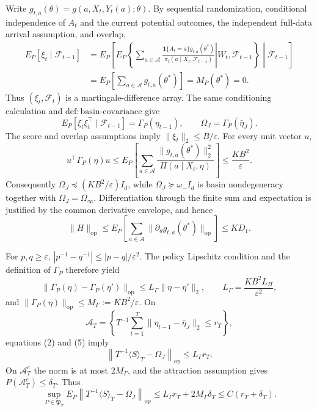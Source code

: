 Write \(g_{t,a}(\theta)=g(a,X_t,Y_t(a);\theta)\). By sequential randomization, conditional independence of \(A_t\) and the current potential outcomes, the independent full-data arrival assumption, and overlap,
\[
\begin{aligned}
 E_P[\xi_t\mid\mathcal F_{t-1}]
 &=E_P\!\left[E_P\!\left\{\left.\sum_{a\in\mathcal A}
 \frac{\mathbf1\{A_t=a\}g_{t,a}(\theta^*)}
 {\pi_t(a\mid X_t,\mathcal F_{t-1})}\right|W_t,\mathcal F_{t-1}\right\}\middle|\mathcal F_{t-1}\right]\nonumber\\
 &=E_P\!\left[\sum_{a\in\mathcal A}g_{t,a}(\theta^*)\right]
 =M_P(\theta^*)=0. \tag{1}
\end{aligned}
\]
Thus \((\xi_t,\mathcal F_t)\) is a martingale-difference array. The same conditioning calculation and \(\mathrm{def:basin\text{-}covariance}\) give
\[
 E_P[\xi_t\xi_t^\top\mid\mathcal F_{t-1}]=\Gamma_P(\eta_{t-1}),
 \qquad \Omega_J=\Gamma_P(\bar\eta_J). \tag{2}
\]
The score and overlap assumptions imply \(\|\xi_t\|_2\le B/\varepsilon\). For every unit vector \(u\),
\[
 u^\top\Gamma_P(\eta)u
 \le E_P\!\left[\sum_{a\in\mathcal A}
 \frac{\|g_{t,a}(\theta^*)\|_2^2}{\Pi(a\mid X_t,\eta)}\right]
 \le\frac{KB^2}{\varepsilon}. \tag{3}
\]
Consequently \(\Omega_J\preceq(KB^2/\varepsilon)I_d\), while \(\Omega_J\succeq\omega_-I_d\) is basin nondegeneracy together with \(\Omega_J=\Omega_\infty\). Differentiation through the finite sum and expectation is justified by the common derivative envelope, and hence
\[
 \|H\|_{\mathrm{op}}
 \le E_P\!\left[\sum_{a\in\mathcal A}
 \|\partial_\theta g_{t,a}(\theta^*)\|_{\mathrm{op}}\right]
 \le KD_1. \tag{4}
\]

For \(p,q\ge\varepsilon\), \(|p^{-1}-q^{-1}|\le|p-q|/\varepsilon^2\). The policy Lipschitz condition and the definition of \(\Gamma_P\) therefore yield
\[
 \|\Gamma_P(\eta)-\Gamma_P(\eta')\|_{\mathrm{op}}
 \le L_\Gamma\|\eta-\eta'\|_2,
 \qquad L_\Gamma=\frac{KB^2L_\Pi}{\varepsilon^2}, \tag{5}
\]
and \(\|\Gamma_P(\eta)\|_{\mathrm{op}}\le M_\Gamma:=KB^2/\varepsilon\). On
\[
 \mathcal A_T=\left\{T^{-1}\sum_{t=1}^T
 \|\eta_{t-1}-\bar\eta_J\|_2\le r_T\right\},
\]
equations (2) and (5) imply
\[
 \left\|T^{-1}\langle S\rangle_T-\Omega_J\right\|_{\mathrm{op}}
 \le L_\Gamma r_T. \tag{6}
\]
On \(\mathcal A_T^c\) the norm is at most \(2M_\Gamma\), and the attraction assumption gives \(P(\mathcal A_T^c)\le\delta_T\). Thus
\[
 \sup_{P\in\mathfrak P_T}E_P\left\|T^{-1}\langle S\rangle_T-\Omega_J\right\|_{\mathrm{op}}
 \le L_\Gamma r_T+2M_\Gamma\delta_T
 \le C(r_T+\delta_T). \tag{7}
\]

